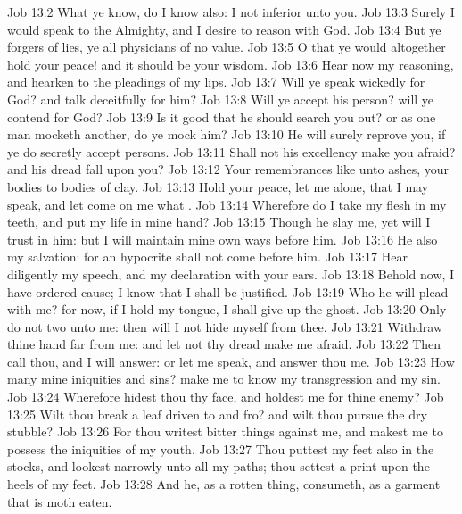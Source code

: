 \vs Job 13:2 What ye know,  do I know also: I  not inferior unto you.
\vs Job 13:3 Surely I would speak to the Almighty, and I desire to reason with God.
\vs Job 13:4 But ye  forgers of lies, ye  all physicians of no value.
\vs Job 13:5 O that ye would altogether hold your peace! and it should be your wisdom.
\vs Job 13:6 Hear now my reasoning, and hearken to the pleadings of my lips.
\vs Job 13:7 Will ye speak wickedly for God? and talk deceitfully for him?
\vs Job 13:8 Will ye accept his person? will ye contend for God?
\vs Job 13:9 Is it good that he should search you out? or as one man mocketh another, do ye  mock him?
\vs Job 13:10 He will surely reprove you, if ye do secretly accept persons.
\vs Job 13:11 Shall not his excellency make you afraid? and his dread fall upon you?
\vs Job 13:12 Your remembrances  like unto ashes, your bodies to bodies of clay.
\vs Job 13:13 Hold your peace, let me alone, that I may speak, and let come on me what .
\vs Job 13:14 Wherefore do I take my flesh in my teeth, and put my life in mine hand?
\vs Job 13:15 Though he slay me, yet will I trust in him: but I will maintain mine own ways before him.
\vs Job 13:16 He also  my salvation: for an hypocrite shall not come before him.
\vs Job 13:17 Hear diligently my speech, and my declaration with your ears.
\vs Job 13:18 Behold now, I have ordered  cause; I know that I shall be justified.
\vs Job 13:19 Who  he  will plead with me? for now, if I hold my tongue, I shall give up the ghost.
\vs Job 13:20 Only do not two  unto me: then will I not hide myself from thee.
\vs Job 13:21 Withdraw thine hand far from me: and let not thy dread make me afraid.
\vs Job 13:22 Then call thou, and I will answer: or let me speak, and answer thou me.
\vs Job 13:23 How many  mine iniquities and sins? make me to know my transgression and my sin.
\vs Job 13:24 Wherefore hidest thou thy face, and holdest me for thine enemy?
\vs Job 13:25 Wilt thou break a leaf driven to and fro? and wilt thou pursue the dry stubble?
\vs Job 13:26 For thou writest bitter things against me, and makest me to possess the iniquities of my youth.
\vs Job 13:27 Thou puttest my feet also in the stocks, and lookest narrowly unto all my paths; thou settest a print upon the heels of my feet.
\vs Job 13:28 And he, as a rotten thing, consumeth, as a garment that is moth eaten.
